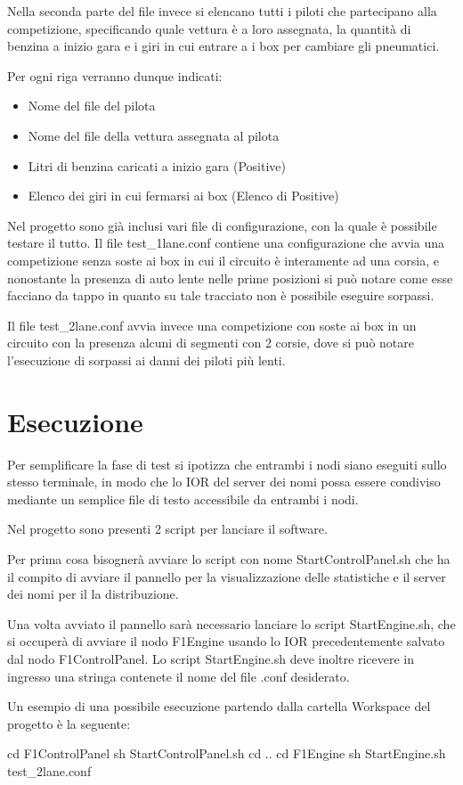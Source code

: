\documentclass[a4paper,11pt, twoside]{book}
\begin{document}
	Nella seconda parte del file invece si elencano tutti i piloti che partecipano alla competizione, 
	specificando quale vettura è a loro assegnata, la quantità di benzina a inizio gara e i giri in cui 
	entrare a i box per cambiare gli pneumatici.
	
	Per ogni riga verranno dunque indicati:
	\begin{itemize}
	  \item Nome del file del pilota
	  \item Nome del file della vettura assegnata al pilota
	  \item Litri di benzina caricati a inizio gara (Positive)
	  \item Elenco dei giri in cui fermarsi ai box (Elenco di Positive)
	\end{itemize}

        Nel progetto sono già inclusi vari file di configurazione, con la quale è possibile testare il tutto.
        Il file test\_1lane.conf contiene una configurazione che avvia una competizione senza soste ai box
	in cui il circuito è interamente ad una corsia,
	e nonostante la presenza di auto lente nelle prime posizioni si può notare come esse facciano da tappo
	in quanto su tale tracciato non è possibile eseguire sorpassi.
	
	Il file test\_2lane.conf avvia invece una competizione con soste ai box in un circuito con la presenza alcuni di segmenti
	con 2 corsie, dove si può notare l'esecuzione di sorpassi ai danni dei piloti più lenti.
	
    \section{Esecuzione}
      Per semplificare la fase di test si ipotizza che entrambi i nodi siano eseguiti sullo stesso terminale, in modo che lo IOR 
      del server dei nomi possa essere condiviso mediante un semplice file di testo accessibile da entrambi i nodi.
      
      Nel progetto sono presenti 2 script per lanciare il software. 
      
      Per prima cosa bisognerà avviare lo script con nome StartControlPanel.sh che ha il compito di avviare il pannello
      per la visualizzazione delle statistiche e il server dei nomi per il la distribuzione.
      
      Una volta avviato il pannello sarà necessario lanciare lo script StartEngine.sh, che si occuperà di avviare il nodo F1Engine
      usando lo IOR precedentemente salvato dal nodo F1ControlPanel.
      Lo script StartEngine.sh deve inoltre ricevere in ingresso una stringa contenete il nome del file .conf
      desiderato.
      
      Un esempio di una possibile esecuzione partendo dalla cartella Workspace del progetto è la seguente:
      
      \begin{xml}
        cd F1ControlPanel
	sh StartControlPanel.sh
	cd ..
	cd F1Engine
	sh StartEngine.sh test_2lane.conf
      \end{xml}
\end{document}
